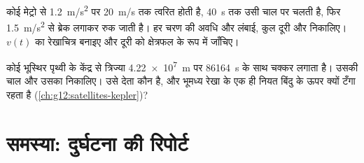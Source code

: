 \begin{exercise}[$\star\star\star$]\label{exo:g12:kinematics-2d:14}
कोई मेट्रो  से \qty{1.2}{m/s^2} पर \qty{20}{m/s} तक त्वरित होती है, \qty{40}{s} तक उसी चाल
पर चलती है, फिर \qty{1.5}{m/s^2} से ब्रेक लगाकर रुक जाती है। हर चरण की अवधि और लंबाई,
कुल दूरी और  निकालिए। $v(t)$ का रेखाचित्र बनाइए और दूरी को
क्षेत्रफल के रूप में जाँचिए।
\end{exercise}

\begin{exercise}[$\star\star\star$]\label{exo:g12:kinematics-2d:15}
कोई भूस्थिर  पृथ्वी के केंद्र से त्रिज्या \qty{4.22e7}{m} पर
 \qty{86164}{s} के साथ चक्कर लगाता है। उसकी चाल और उसका
 निकालिए। उसे देता कौन है, और  भूमध्य
रेखा के एक ही नियत बिंदु के ऊपर क्यों टँगा रहता है (\cref{ch:g12:satellites-kepler})?
\end{exercise}

\section{समस्या: दुर्घटना की रिपोर्ट}

